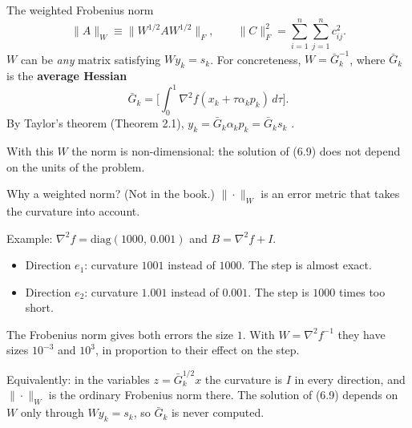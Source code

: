 \documentclass[aspectratio=169,12pt]{beamer}
\newcommand{\hessf}{\nabla^{2} f}
\newcommand{\Gbar}{\bar{G}}
\newcommand{\eqn}[1]{\text{\small(#1)}}
\newcommand{\notinbook}{{\small(Not in the book.)}}
\begin{document}
\begin{frame}{The weighted Frobenius norm}
  \[
    \|A\|_{W}\equiv\big\|W^{1/2}AW^{1/2}\big\|_{F},
    \qquad \|C\|_{F}^{2}=\textstyle\sum_{i=1}^{n}\sum_{j=1}^{n}c_{ij}^{2} .
    \tag{6.10}
  \]
  $W$ can be \emph{any} matrix satisfying $Wy_{k}=s_{k}$.
  For concreteness, $W=\Gbar_{k}^{-1}$, where $\Gbar_{k}$ is the \textbf{average Hessian}
  \[ \Gbar_{k}=\Big[\int_{0}^{1}\hessf(x_{k}+\tau\alpha_{k}p_{k})\,d\tau\Big] . \tag{6.11} \]
  By Taylor's theorem (Theorem 2.1),\quad
  $y_{k}=\Gbar_{k}\alpha_{k}p_{k}=\Gbar_{k}s_{k}$ \eqn{6.12}.

  \vspace{0.5em}
  With this $W$ the norm is non-dimensional: the solution of (6.9) does not depend on the
  units of the problem.
\end{frame}

\begin{frame}{Why a weighted norm? \notinbook}
  $\|\cdot\|_{W}$ is an error metric that takes the curvature into account.

  \vspace{0.4em}
  Example: $\hessf=\mathrm{diag}(1000,\,0.001)$ and $B=\hessf+I$.
  \begin{itemize}\setlength\itemsep{0.3em}
    \item Direction $e_{1}$: curvature $1001$ instead of $1000$. The step is almost exact.
    \item Direction $e_{2}$: curvature $1.001$ instead of $0.001$. The step is $1000$ times too short.
  \end{itemize}
  The Frobenius norm gives both errors the size $1$. With $W=\hessf^{-1}$ they have sizes
  $10^{-3}$ and $10^{3}$, in proportion to their effect on the step.

  \vspace{0.4em}
  Equivalently: in the variables $z=\Gbar_{k}^{1/2}x$ the curvature is $I$ in every direction, and
  $\|\cdot\|_{W}$ is the ordinary Frobenius norm there.
  The solution of (6.9) depends on $W$ only through $Wy_{k}=s_{k}$, so $\Gbar_{k}$ is never computed.
\end{frame}
\end{document}
